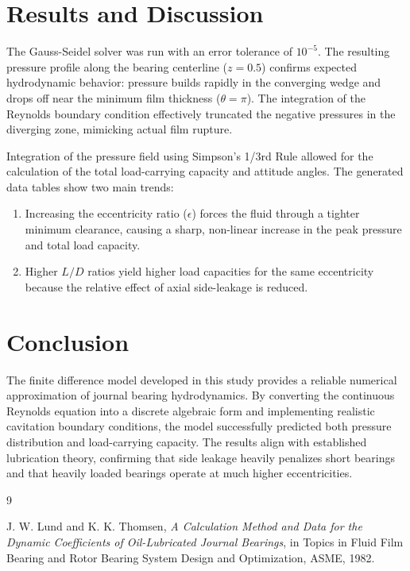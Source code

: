 \documentclass[12pt, a4paper]{article}
\begin{document}
\section{Results and Discussion}
The Gauss-Seidel solver was run with an error tolerance of $10^{-5}$. The resulting pressure profile along the bearing centerline ($z = 0.5$) confirms expected hydrodynamic behavior: pressure builds rapidly in the converging wedge and drops off near the minimum film thickness ($\theta = \pi$). The integration of the Reynolds boundary condition effectively truncated the negative pressures in the diverging zone, mimicking actual film rupture.

Integration of the pressure field using Simpson's 1/3rd Rule allowed for the calculation of the total load-carrying capacity and attitude angles. The generated data tables show two main trends:
\begin{enumerate}
    \item Increasing the eccentricity ratio ($\epsilon$) forces the fluid through a tighter minimum clearance, causing a sharp, non-linear increase in the peak pressure and total load capacity.
    \item Higher $L/D$ ratios yield higher load capacities for the same eccentricity because the relative effect of axial side-leakage is reduced.
\end{enumerate}

\section{Conclusion}
The finite difference model developed in this study provides a reliable numerical approximation of journal bearing hydrodynamics. By converting the continuous Reynolds equation into a discrete algebraic form and implementing realistic cavitation boundary conditions, the model successfully predicted both pressure distribution and load-carrying capacity. The results align with established lubrication theory, confirming that side leakage heavily penalizes short bearings and that heavily loaded bearings operate at much higher eccentricities.

\begin{thebibliography}{9}

J. W. Lund and K. K. Thomsen, \textit{A Calculation Method and Data for the Dynamic Coefficients of Oil-Lubricated Journal Bearings}, in Topics in Fluid Film Bearing and Rotor Bearing System Design and Optimization, ASME, 1982.

\end{thebibliography}
\end{document}
